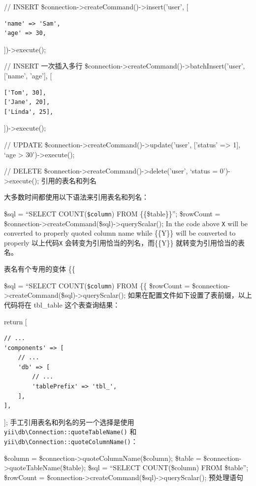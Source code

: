 // INSERT
\$connection->createCommand()->insert('user', [

\begin{lstlisting}
'name' => 'Sam',
'age' => 30,
\end{lstlisting}
])->execute();

// INSERT 一次插入多行
\$connection->createCommand()->batchInsert('user', ['name', 'age'], [

\begin{lstlisting}
['Tom', 30],
['Jane', 20],
['Linda', 25],
\end{lstlisting}
])->execute();

// UPDATE
\$connection->createCommand()->update('user', ['status' => 1], `age > 30')->execute();

// DELETE
\$connection->createCommand()->delete('user', `status = 0')->execute();
引用的表名和列名

大多数时间都使用以下语法来引用表名和列名：

\$sql = ``SELECT COUNT(\texttt{\$column}) FROM \{\{\$table\}\}'';
\$rowCount = \$connection->createCommand(\$sql)->queryScalar();
In the code above \texttt{X} will be converted to properly quoted column name while \{\{Y\}\} will be converted to properly 以上代码\texttt{X} 会转变为引用恰当的列名，而\{\{Y\}\} 就转变为引用恰当的表名。

表名有个专用的变体 \{\{%

\$sql = ``SELECT COUNT(\texttt{\$column}) FROM \{\{%
\$rowCount = \$connection->createCommand(\$sql)->queryScalar();
如果在配置文件如下设置了表前缀，以上代码将在 tbl\_table 这个表查询结果：

return [

\begin{lstlisting}
// ...
'components' => [
    // ...
    'db' => [
        // ...
        'tablePrefix' => 'tbl_',
    ],
],
\end{lstlisting}
];
手工引用表名和列名的另一个选择是使用\texttt{yii{\allowbreak{}\textbackslash}db{\allowbreak{}\textbackslash}Connection\allowbreak{}::\allowbreak{}quoteTableName()} 和 \texttt{yii{\allowbreak{}\textbackslash}db{\allowbreak{}\textbackslash}Connection\allowbreak{}::\allowbreak{}quoteColumnName()}：

\$column = \$connection->quoteColumnName(\$column);
\$table = \$connection->quoteTableName(\$table);
\$sql = ``SELECT COUNT(\$column) FROM \$table'';
\$rowCount = \$connection->createCommand(\$sql)->queryScalar();
预处理语句

